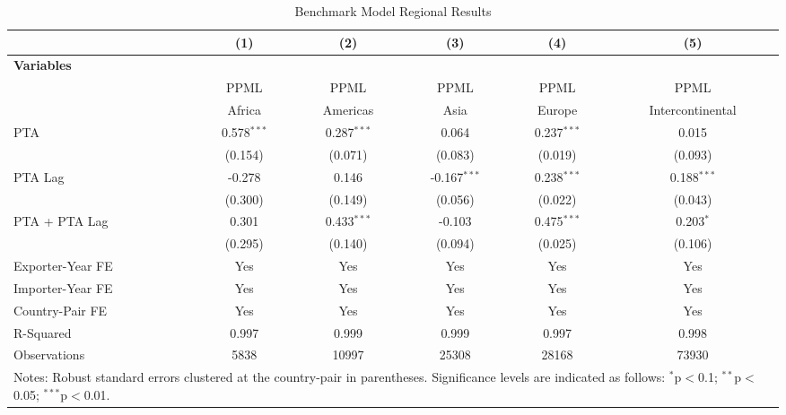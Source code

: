 \begin{table}[htbp]
    \centering
    \caption{Benchmark Model Regional Results}
    \label{tab:benchmark_region_analysis} %
    \begin{adjustbox}{max width=\textwidth}
    \begin{tabular}{lccccc}
    \hline
     & \multicolumn{1}{c}{(1)} & \multicolumn{1}{c}{(2)} & \multicolumn{1}{c}{(3)} & \multicolumn{1}{c}{(4)} & \multicolumn{1}{c}{(5)} \\
    \hline
    \textbf{Variables} &  &  &  &  &  \\
    \hline
     & PPML & PPML & PPML & PPML & PPML \\
     & Africa & Americas & Asia & Europe & Intercontinental \\
    \hline
    PTA & 0.578$^{\ast\ast\ast}$ & 0.287$^{\ast\ast\ast}$ & 0.064 & 0.237$^{\ast\ast\ast}$ & 0.015 \\
    & (0.154) & (0.071) & (0.083) & (0.019) & (0.093) \\

    PTA Lag & -0.278 & 0.146 & -0.167$^{\ast\ast\ast}$ & 0.238$^{\ast\ast\ast}$ & 0.188$^{\ast\ast\ast}$ \\
    & (0.300) & (0.149) & (0.056) & (0.022) & (0.043) \\

    PTA + PTA Lag & 0.301 & 0.433$^{\ast\ast\ast}$ & -0.103 & 0.475$^{\ast\ast\ast}$ & 0.203$^{\ast}$ \\
    & (0.295) & (0.140) & (0.094) & (0.025) & (0.106) \\
    \hline
    Exporter-Year FE & Yes & Yes & Yes & Yes & Yes \\
    Importer-Year FE & Yes & Yes & Yes & Yes & Yes \\
    Country-Pair FE & Yes & Yes & Yes & Yes & Yes \\
    R-Squared & 0.997 & 0.999 & 0.999 & 0.997 & 0.998 \\
    Observations & 5838 & 10997 & 25308 & 28168 & 73930 \\
    \hline
    \multicolumn{6}{l}{\footnotesize{Notes: Robust standard errors clustered at the country-pair in parentheses. Significance levels are indicated as follows: $^{\ast}$p$<$0.1; $^{\ast\ast}$p$<$0.05; $^{\ast\ast\ast}$p$<$0.01.}} \\
    \end{tabular}
    \end{adjustbox}
\end{table}    